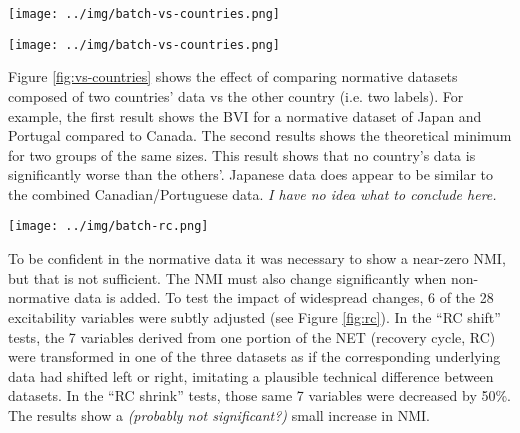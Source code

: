 \documentclass[12pt]{article}
\begin{document}
\pagebreak

\begin{figure*}
  \centering
       \texttt{[image: ../img/batch-vs-countries.png]}
         \caption{}
  \label{fig:vs-countries}
\end{figure*}


\pagebreak

\begin{figure*}
  \centering
       \texttt{[image: ../img/batch-vs-countries.png]}
         \caption{}
  \label{fig:vs-countries}
\end{figure*}

Figure \ref{fig:vs-countries} shows the effect of comparing normative datasets composed of two countries' data vs the other country (i.e. two labels). For example, the first result shows the BVI for a normative dataset of Japan and Portugal compared to Canada. The second results shows the theoretical minimum for two groups of the same sizes. This result shows that no country's data is significantly worse than the others'. Japanese data does appear to be similar to the combined Canadian/Portuguese data. \emph{I have no idea what to conclude here.}

\pagebreak

\begin{figure*}
  \centering
       \texttt{[image: ../img/batch-rc.png]}
         \caption{}
  \label{fig:rc}
\end{figure*}

To be confident in the normative data it was necessary to show a near-zero NMI, but that is not sufficient. The NMI must also change significantly when non-normative data is added. To test the impact of widespread changes, 6 of the 28 excitability variables were subtly adjusted (see Figure \ref{fig:rc}). In the ``RC shift'' tests, the 7 variables derived from one portion of the NET (recovery cycle, RC) were transformed in one of the three datasets as if the corresponding underlying data had shifted left or right, imitating a plausible technical difference between datasets. In the ``RC shrink'' tests, those same 7 variables were decreased by 50\%. The results show a \emph{(probably not significant?)} small increase in NMI.

\end{document}
